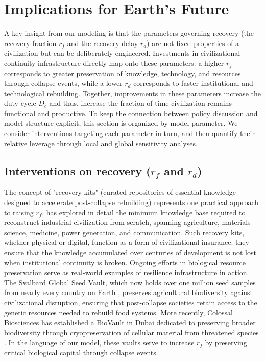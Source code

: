 \section{Implications for Earth's Future}\label{earth-implications}

A key insight from our modeling is that the parameters governing recovery (the recovery fraction $r_f$ and the recovery delay $r_d$) are not fixed properties of a civilization but can be deliberately engineered. Investments in civilizational continuity infrastructure directly map onto these parameters: a higher $r_f$ corresponds to greater preservation of knowledge, technology, and resources through collapse events, while a lower $r_d$ corresponds to faster institutional and technological rebuilding. Together, improvements in these parameters increase the duty cycle $D_c$ and thus, increase the fraction of time civilization remains functional and productive. To keep the connection between policy discussion and model structure explicit, this section is organized by model parameter. We consider interventions targeting each parameter in turn, and then quantify their relative leverage through local and global sensitivity analyses.

\subsection{\texorpdfstring{Interventions on recovery ($r_f$ and $r_d$)}{Interventions on recovery (rf and rd)}}

The concept of "recovery kits" (curated repositories of essential knowledge designed to accelerate post-collapse rebuilding) represents one practical approach to raising $r_f$. \citet{Dartnell2014-tk} has explored in detail the minimum knowledge base required to reconstruct industrial civilization from scratch, spanning agriculture, materials science, medicine, power generation, and communication. Such recovery kits, whether physical or digital, function as a form of civilizational insurance: they ensure that the knowledge accumulated over centuries of development is not lost when institutional continuity is broken. Ongoing efforts in biological resource preservation serve as real-world examples of resilience infrastructure in action. The Svalbard Global Seed Vault, which now holds over one million seed samples from nearly every country on Earth \citep{Asdal2020-sv}, preserves agricultural biodiversity against civilizational disruption, ensuring that post-collapse societies retain access to the genetic resources needed to rebuild food systems. More recently, Colossal Biosciences has established a BioVault in Dubai dedicated to preserving broader biodiversity through cryopreservation of cellular material from threatened species \citep{Colossal2024-bv}. In the language of our model, these vaults serve to increase $r_f$ by preserving critical biological capital through collapse events.

